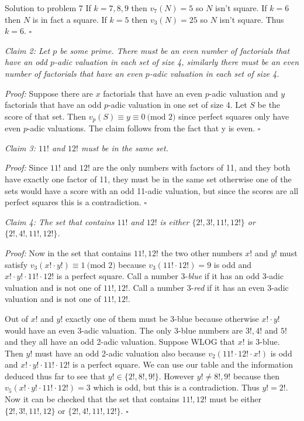 \documentclass{article}
\begin{document}
\begin{solution}{Solution to problem 7}
If $k = 7,8,9$ then $v_7(N) = 5$ so $N$ isn't square.
If $k = 6$ then $N$ is in fact a square.
If $k = 5$ then $v_3(N) = 25$ so $N$ isn't square.
Thus $k = 6$. $\square$ \vspace{0.4cm}

\textit{Claim 2: Let $p$ be some prime. There must be an even number of
factorials that have an odd $p$-adic valuation
in each set of size 4, similarly there must be an even number of factorials
that have an even $p$-adic valuation in each set of size 4.}
\vspace{0.2cm}

\textit{Proof:} Suppose there are $x$ factorials that have an even $p$-adic
valuation and $y$ factorials that have an odd
$p$-adic valuation in one set of size 4. Let $S$ be the score of that set.
Then $v_p (S) \equiv y \equiv 0 \ \text{(mod } 2)$ since
perfect squares only have even $p$-adic valuations. The claim follows from
the fact that y is even. $\square$
\vspace{0.4cm}

\textit{Claim 3: $11!$ and $12!$ must be in the same set. }
\vspace{0.2cm}

\textit{Proof:} Since $11!$ and $12!$ are the only numbers with factors of
11, and they both have exactly one factor of 11, they must be in the same
set otherwise one of the sets would have a score with an
odd 11-adic valuation, but since the scores are all perfect squares this
is a contradiction. $\square$
\vspace{0.4cm}

\textit{Claim 4: The set that contains $11!$ and $12!$ is either
$\{2!, 3!, 11!, 12! \}$ or $\{2!, 4!, 11!, 12!\}$.}
\vspace{0.2cm}

\textit{Proof:}
Now in the set that contains $11!, 12!$ the two other numbers $x!$ and
$y!$ must satisfy $v_3(x!\cdot y!) \equiv 1 \ \text{(mod }2)$ because
$v_3(11!\cdot 12!) = 9$ is odd and $x!\cdot y!\cdot 11!\cdot 12!$ is a
perfect square. Call a number 3-\textit{blue} if it has an odd 3-adic
valuation and is not one of $11!, 12!$. Call a number 3-\textit{red} if it
has an even 3-adic valuation and is not one of $11!, 12!$.\vspace{0.2cm}

Out of $x!$ and $y!$ exactly one of them must be 3-blue because otherwise
$x!\cdot y!$ would have an even 3-adic valuation. The only 3-blue numbers
are $3!,4!$ and $5!$ and they all have an odd 2-adic valuation. Suppose
WLOG that $x!$ is 3-blue. Then $y!$ must have an odd 2-adic valuation
also because $v_2(11!\cdot 12!\cdot x!)$ is odd and
$x!\cdot y!\cdot 11!\cdot 12!$ is a perfect square. We can use our table
and the information deduced thus far to see that $y! \in \{ 2!, 8!, 9! \}$.
However $y! \neq 8!, 9!$ because then $v_5(x!\cdot y!\cdot 11!\cdot 12!)=3$
which is odd, but this is a contradiction. Thus $y!=2!$. Now it can be
checked that the set that contains $11!, 12!$ must be either
$\{2!, 3!, 11!, 12 \}$ or $\{2!, 4!, 11!, 12!\}$. $\square$
\vspace{0.4cm}


\end{solution}
\end{document}
